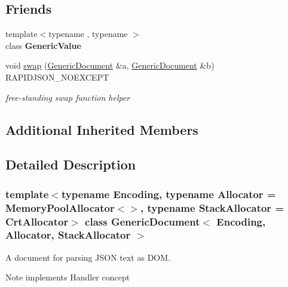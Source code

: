 \subsection*{Friends}
\begin{DoxyCompactItemize}
\item 
\mbox{\label{class_generic_document_a899449e1a645b5e377af059fb61113d8}} 
{\footnotesize template$<$typename , typename $>$ }\\class {\bfseries Generic\+Value}
\item 
void \hyperlink{class_generic_document_a0d63efcc43758ac3aed77e868233369d}{swap} (\hyperlink{class_generic_document}{Generic\+Document} \&a, \hyperlink{class_generic_document}{Generic\+Document} \&b) R\+A\+P\+I\+D\+J\+S\+O\+N\+\_\+\+N\+O\+E\+X\+C\+E\+PT
\begin{DoxyCompactList}\small\item\em free-\/standing swap function helper \end{DoxyCompactList}\end{DoxyCompactItemize}
\subsection*{Additional Inherited Members}


\subsection{Detailed Description}
\subsubsection*{template$<$typename Encoding, typename Allocator = Memory\+Pool\+Allocator$<$$>$, typename Stack\+Allocator = Crt\+Allocator$>$\newline
class Generic\+Document$<$ Encoding, Allocator, Stack\+Allocator $>$}

A document for parsing J\+S\+ON text as D\+OM. 

\begin{DoxyNote}{Note}
implements Handler concept 
\end{DoxyNote}

